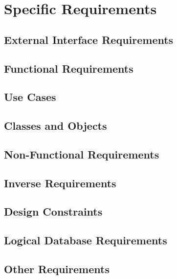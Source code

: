 
\section{Specific Requirements}

	\subsection{External Interface Requirements}
		

	\subsection{Functional Requirements}
		
		
		
		
		
		
		
	\subsection{Use Cases}
		
		
		
		
		
		
		
	\subsection{Classes and Objects}
		
		
		
		
		
		


	\subsection{Non-Functional Requirements}
		

	\subsection{Inverse Requirements}


	\subsection{Design Constraints}


	\subsection{Logical Database Requirements}


	\subsection{Other Requirements}